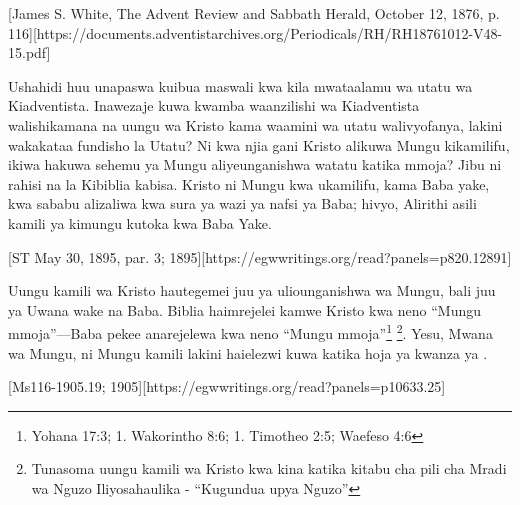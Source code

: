 [James S. White, The Advent Review and Sabbath Herald, October 12, 1876, p. 116][https://documents.adventistarchives.org/Periodicals/RH/RH18761012-V48-15.pdf]


Ushahidi huu unapaswa kuibua maswali kwa kila mwataalamu wa utatu wa Kiadventista. Inawezaje kuwa kwamba waanzilishi wa Kiadventista walishikamana na uungu wa Kristo kama waamini wa utatu walivyofanya, lakini wakakataa fundisho la Utatu? Ni kwa njia gani Kristo alikuwa Mungu kikamilifu, ikiwa hakuwa sehemu ya Mungu aliyeunganishwa watatu katika mmoja? Jibu ni rahisi na la Kibiblia kabisa. Kristo ni Mungu kwa ukamilifu, kama Baba yake, kwa sababu alizaliwa kwa sura ya wazi ya nafsi ya Baba; hivyo, Alirithi asili kamili ya kimungu kutoka kwa Baba Yake.


[ST May 30, 1895, par. 3; 1895][https://egwwritings.org/read?panels=p820.12891]


Uungu kamili wa Kristo hautegemei juu ya  uliounganishwa wa Mungu, bali juu ya Uwana wake na Baba. Biblia haimrejelei kamwe Kristo kwa neno “Mungu mmoja”—Baba pekee anarejelewa kwa neno “Mungu mmoja”\footnote{Yohana 17:3; 1. Wakorintho 8:6; 1. Timotheo 2:5; Waefeso 4:6} \footnote{Tunasoma uungu kamili wa Kristo kwa kina katika kitabu cha pili cha Mradi wa Nguzo Iliyosahaulika - “Kugundua upya Nguzo”}. Yesu, Mwana wa Mungu, ni Mungu kamili lakini haielezwi kuwa  katika hoja ya kwanza ya .


[Ms116-1905.19; 1905][https://egwwritings.org/read?panels=p10633.25]


